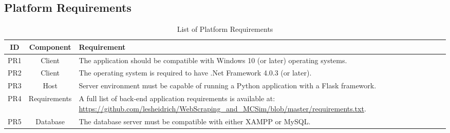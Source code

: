 \documentclass{thesis-ekf}
\theoremstyle{definition}
\theoremstyle{remark}
\begin{document}
\subsection{Platform Requirements}
\begin{table}[H]
	\centering
	\begin{tabular}{|c|c|>{\raggedright\arraybackslash}p{10cm}|}
		\hline
		\textbf{ID} & \textbf{Component} & \textbf{Requirement} \\
		\hline
		PR1 & Client & The application should be compatible with Windows 10 (or later) operating systems. \\
		\hline
		PR2 & Client & The operating system is required to have .Net Framework 4.0.3 (or later). \\
		\hline
		PR3 & Host & Server environment must be capable of running a Python application with a Flask framework. \\
		\hline
		PR4 & Requirements & A full list of back-end application requirements is available at: \url{https://github.com/lesheidrich/WebScraping_and_MCSim/blob/master/requirements.txt}. \\
		\hline
		PR5 & Database & The database server must be compatible with either XAMPP or MySQL. \\
		\hline
	\end{tabular}
	\caption{List of Platform Requirements}
	\label{table-platform-req}
\end{table}
\end{document}
